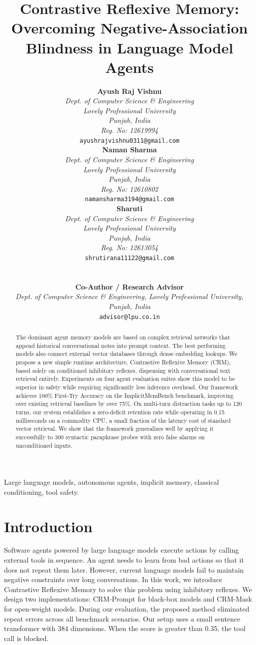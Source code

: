 \documentclass[10pt,conference]{IEEEtran}
\title{Contrastive Reflexive Memory: Overcoming Negative-Association Blindness in Language Model Agents}
\author{
\noindent\begin{minipage}[t]{0.32\textwidth}%
\centering
{\normalsize \textbf{Ayush Raj Vishnu}}\\[0.2ex]
{\footnotesize \textit{Dept. of Computer Science \& Engineering}}\\[0.1ex]
{\footnotesize \textit{Lovely Professional University}}\\[0.1ex]
{\footnotesize \textit{Punjab, India}}\\[0.1ex]
{\footnotesize \textit{Reg. No: 12619994}}\\[0.1ex]
{\footnotesize \texttt{ayushrajvishnu0311@gmail.com}}%
\end{minipage}\hfill
\begin{minipage}[t]{0.32\textwidth}%
\centering
{\normalsize \textbf{Naman Sharma}}\\[0.2ex]
{\footnotesize \textit{Dept. of Computer Science \& Engineering}}\\[0.1ex]
{\footnotesize \textit{Lovely Professional University}}\\[0.1ex]
{\footnotesize \textit{Punjab, India}}\\[0.1ex]
{\footnotesize \textit{Reg. No: 12610802}}\\[0.1ex]
{\footnotesize \texttt{namansharma3194@gmail.com}}%
\end{minipage}\hfill
\begin{minipage}[t]{0.32\textwidth}%
\centering
{\normalsize \textbf{Sharuti}}\\[0.2ex]
{\footnotesize \textit{Dept. of Computer Science \& Engineering}}\\[0.1ex]
{\footnotesize \textit{Lovely Professional University}}\\[0.1ex]
{\footnotesize \textit{Punjab, India}}\\[0.1ex]
{\footnotesize \textit{Reg. No: 12613054}}\\[0.1ex]
{\footnotesize \texttt{shrutirana11122@gmail.com}}%
\end{minipage}\\[1.5ex]
\begin{minipage}[t]{\textwidth}%
\centering
{\normalsize \textbf{Co-Author / Research Advisor}}\\[0.2ex]
{\footnotesize \textit{Dept. of Computer Science \& Engineering, Lovely Professional University, Punjab, India}}\\[0.1ex]
{\footnotesize \texttt{advisor@lpu.co.in}}%
\end{minipage}%
}
\begin{document}
\maketitle

\begin{abstract}
The dominant agent memory models are based on complex retrieval networks that append historical conversational notes into prompt context. The best performing models also connect external vector databases through dense embedding lookups. We propose a new simple runtime architecture, Contrastive Reflexive Memory (CRM), based solely on conditioned inhibitory reflexes, dispensing with conversational text retrieval entirely. Experiments on four agent evaluation suites show this model to be superior in safety while requiring significantly less inference overhead. Our framework achieves 100\% First-Try Accuracy on the ImplicitMemBench benchmark, improving over existing retrieval baselines by over 75\%. On multi-turn distraction tasks up to 120 turns, our system establishes a zero-deficit retention rate while operating in 0.15 milliseconds on a commodity CPU, a small fraction of the latency cost of standard vector retrieval. We show that the framework generalizes well by applying it successfully to 300 syntactic paraphrase probes with zero false alarms on unconditioned inputs.
\end{abstract}

\begin{IEEEkeywords}
Large language models, autonomous agents, implicit memory, classical conditioning, tool safety.
\end{IEEEkeywords}

\section{Introduction}

Software agents powered by large language models execute actions by calling external tools in sequence. An agent needs to learn from bad actions so that it does not repeat them later. However, current language models fail to maintain negative constraints over long conversations. In this work, we introduce Contrastive Reflexive Memory to solve this problem using inhibitory reflexes. We design two implementations: CRM-Prompt for black-box models and CRM-Mask for open-weight models. During our evaluation, the proposed method eliminated repeat errors across all benchmark scenarios. Our setup uses a small sentence transformer with 384 dimensions. When the score is greater than 0.35, the tool call is blocked.
\end{document}
